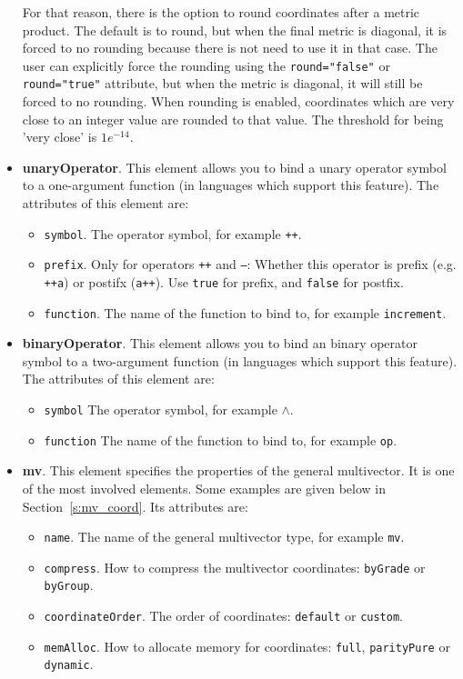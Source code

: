 \documentclass[10pt, a4paper]{article}
\begin{document}
\begin{itemize}
      For that reason, there is the option to round coordinates after a metric product.
      The default is to round, but when the final metric is diagonal, it is forced
      to no rounding because there is not need to use it in that case. 
      The user can explicitly force the rounding using the {\tt round="false"} or {\tt round="true"} attribute,
      but when the metric is diagonal, it will still be forced to no rounding.
      When rounding is enabled, coordinates which are very close to an integer
      value are rounded to that value. The threshold for being 'very close' is $1e^{-14}$.
      
\item {\bf unaryOperator}. This element allows you to bind a unary operator symbol to a one-argument function (in
      languages which support this feature). The attributes of this element are:
       \begin{itemize}
       \item {\tt symbol}. The operator symbol, for example {\tt ++}.
       \item {\tt prefix}. Only for operators {\tt ++} and {\tt --}:
            Whether this operator is prefix (e.g. {\tt ++a}) or postifx ({\tt a++}). Use {\tt true}
            for prefix, and {\tt false} for postfix. 
       \item {\tt function}. The name of the function to bind to, for example {\tt increment}.
       \end{itemize}
         
\item {\bf binaryOperator}. This element allows you to bind an binary operator symbol to a two-argument function (in
      languages which support this feature). The attributes of this element are:
       \begin{itemize}
         \item {\tt symbol} The operator symbol, for example {\tt $\wedge$}.
         \item  {\tt function} The name of the function to bind to, for example {\tt op}.
       \end{itemize}
       
      
\item {\bf mv}. This element specifies the properties of the general multivector. It is one of the most involved elements.
      Some examples are given below in Section~\ref{s:mv_coord}.
      Its attributes are:
       \begin{itemize}
         \item {\tt name}. The name of the general multivector type, for example {\tt mv}.
         \item {\tt compress}. How to compress the multivector coordinates: {\tt byGrade} or {\tt byGroup}.
         \item {\tt coordinateOrder}. The order of coordinates: {\tt default} or {\tt custom}.
         \item {\tt memAlloc}. How to allocate memory for coordinates: {\tt full}, {\tt parityPure} or {\tt dynamic}.
       \end{itemize}
         

\end{itemize}
\end{document}
